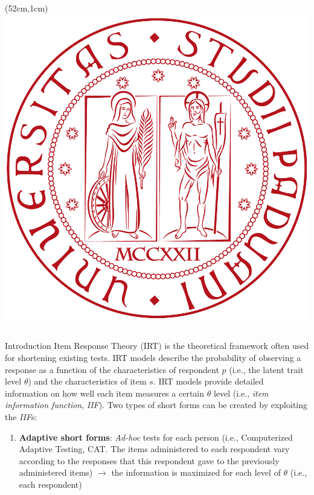 \documentclass[final,t]{beamer}
\begin{document}
\begin{frame}
\begin{center}
		\begin{textblock*}{5cm}(52cm,1cm)
			\includegraphics[width=\linewidth]{img/unipd.png}\\
		\end{textblock*}
		
		\vspace{3mm}
		
		
		
	\end{center}
	
	
		\begin{columns}[t]
	
			
			\begin{column}{.45\linewidth}
		\begin{block}{\centering Introduction}
	Item Response Theory (IRT) is the theoretical framework often used for shortening existing tests.  IRT models describe the probability of observing a response as a function of the characteristics of respondent $p$ (i.e., the latent trait level $\theta$) and the characteristics of item $s$. IRT models provide detailed information on how well each item measures a certain $\theta$ level (i.e., \emph{item information function}, \emph{IIF}). 
	Two types of short forms can be created by exploiting the \emph{IIF}s: 
	
	\begin{enumerate}
		\item \textbf{Adaptive short forms}: \emph{Ad-hoc} tests for each person (i.e., Computerized Adaptive Testing, CAT. The items administered to each respondent vary according to the responses that this respondent gave to the previously administered items) $\rightarrow$ the information is maximized for each level of $\theta$ (i.e., each respondent)
		

\end{enumerate}
\end{block}
\end{column}
\end{columns}
\end{frame}
\end{document}
